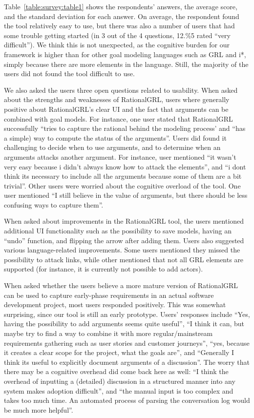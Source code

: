 Table~\ref{table:survey:table1} shows the respondents' answers, the average score, and the standard deviation for each answer. On average, the respondent found the tool relatively easy to use, but there was also a number of users that had some trouble getting started (in 3 out of the 4 questions, 12.\%5 rated ``very difficult''). We think this is not unexpected, as the cognitive burden for our framework is higher than for other goal modeling languages such as GRL and i*, simply because there are more elements in the language. Still, the majority of the users did not found the tool difficult to use.

We also asked the users three open questions related to usability. When asked about the strengths and weaknesses of RationalGRL, users where generally positive about RationalGRL's clear UI and the fact that arguments can be combined with goal models. For instance, one user stated that RationalGRL successfully ``tries to capture the rational behind the modeling process' and ``has a simple) way to compute the status of the arguments''. Users did found it challenging to decide when to use arguments, and to determine when an arguments attacks another argument. For instance, user mentioned ``it wasn't very easy because i didn't always know how to attack the elements'', and ``i dont think its necessary to include all the arguments because some of them are a bit trivial''. Other users were worried about the cognitive overload of the tool. One user mentioned ``I still believe in the value of arguments, but there should be less confusing ways to capture them''. 

When asked about improvements in the RationalGRL tool, the users mentioned additional UI functionality such as the possibility to save models, having an ``undo'' function, and flipping the arrow after adding them. Users also suggested various language-related improvements. Some users mentioned they missed the possibility to attack links, while other mentioned that not all GRL elements are supported (for instance, it is currently not possible to add actors).

When asked whether the users believe a more mature version of RationalGRL can be used to capture early-phase requirements in an actual software development project, most users responded positively. This was somewhat surprising, since our tool is still an early prototype. Users' responses include ``Yes, having the possibility to add arguments seems quite useful'', ``I think it can, but maybe try to find a way to combine it with more regular/mainstream requirements gathering such as user stories and customer journeys'', ``yes, because it creates a clear scope for the project, what the goals are'', and ``Generally I think its useful to explicitly document arguments of a discussion''. The worry that there may be a cognitive overhead did come back here as well: ``I think the overhead of inputting a (detailed) discussion in a structured manner into any system makes adoption difficult'', and ``the manual input is too complex and takes too much time. An automated process of parsing the conversation log would be much more helpful''. 

